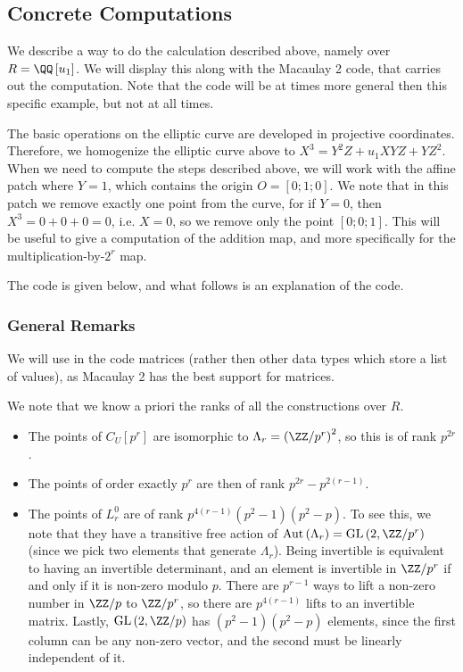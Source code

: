 \subsection{Concrete Computations}

We describe a way to do the calculation described above, namely over $R = \QQ\left[u_1\right]$.
We will display this along with the Macaulay 2 code, that carries out the computation.
Note that the code will be at times more general then this specific example, but not at all times.

The basic operations on the elliptic curve are developed in projective coordinates.
Therefore, we homogenize the elliptic curve above to $X^3 = Y^2 Z + u_1 X Y Z + Y Z^2$.
When we need to compute the steps described above, we will work with the affine patch where $Y = 1$, which contains the origin $O = \left[0;1;0\right]$.
We note that in this patch we remove exactly one point from the curve, for if $Y = 0$, then $X^3 = 0 + 0 + 0 = 0$, i.e. $X = 0$, so we remove only the point $\left[0;0;1\right]$.
This will be useful to give a computation of the addition map, and more specifically for the multiplication-by-$2^r$ map.

The code is given below, and what follows is an explanation of the code.

\subsubsection{General Remarks}\label{rank-considerations}

We will use in the code matrices (rather then other data types which store a list of values), as Macaulay 2 has the best support for matrices.

We note that we know a priori the ranks of all the constructions over $R$.
\begin{itemize}
	\item The points of $C_U\left[p^r\right]$ are isomorphic to $\Lambda_r = \left(\ZZ/p^r\right)^2$, so this is of rank $p^{2r}$.
	\item The points of order exactly $p^r$ are then of rank $p^{2r}-p^{2\left(r-1\right)}$.
	\item
		The points of $L_r^0$ are of rank $p^{4\left(r-1\right)}\left(p^2-1\right)\left(p^2-p\right)$.
		To see this, we note that they have a transitive free action of $\aut\left(\Lambda_r\right) = \GL\left(2, \ZZ/p^r\right)$ (since we pick two elements that generate $\Lambda_r$).
		Being invertible is equivalent to having an invertible determinant, and an element is invertible in $\ZZ/p^r$ if and only if it is non-zero modulo $p$.
		There are $p^{r-1}$ ways to lift a non-zero number in $\ZZ/p$ to $\ZZ/p^r$, so there are $p^{4\left(r-1\right)}$ lifts to an invertible matrix.
		Lastly, $\GL\left(2, \ZZ/p\right)$ has $\left(p^2-1\right)\left(p^2-p\right)$ elements, since the first column can be any non-zero vector, and the second must be linearly independent of it.
\end{itemize}

